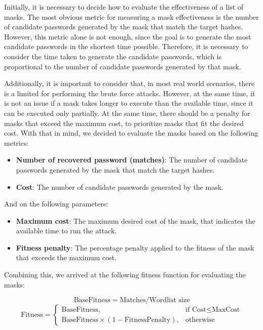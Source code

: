 \documentclass[sigconf,authordraft]{acmart}
\begin{document}
Initially, it is necessary to decide how to evaluate the effectiveness of a list of masks.
The most obvious metric for measuring a mask effectiveness is the number of candidate passwords generated by the mask that match the target hashes.
However, this metric alone is not enough, since the goal is to generate the most candidate passwords in the shortest time possible.
Therefore, it is necessary to consider the time taken to generate the candidate passwords, which is proportional to the number of candidate passwords generated by that mask.

Additionally, it is important to consider that, in most real world scenarios, there is a limited for performing the brute force attacks.
However, at the same time, it is not an issue if a mask takes longer to execute than the available time, since it can be executed only partially.
At the same time, there should be a penalty for masks that exceed the maximum cost, to prioritize masks that fit the desired cost.
With that in mind, we decided to evaluate the masks based on the following metrics:

\begin{itemize}
  \item \textbf{Number of recovered password (matches)}: The number of candidate passwords generated by the mask that match the target hashes.
  \item \textbf{Cost}: The number of candidate passwords generated by the mask.
\end{itemize}

And on the following parameters:

\begin{itemize}
  \item \textbf{Maximum cost}: The maximum desired cost of the mask, that indicates the available time to run the attack.
  \item \textbf{Fitness penalty}: The percentage penalty applied to the fitness of the mask that exceeds the maximum cost.
\end{itemize}

Combining this, we arrived at the following fitness function for evaluating the masks:

\begin{equation}
\label{eq:fitness_function}
  \text{BaseFitness} = \text{Matches} / \text{Wordlist size}
\end{equation}
\begin{equation}
  \text{Fitness} = 
  \begin{cases}
    \text{BaseFitness}, & \text{if Cost} \leq \text{MaxCost} \\
    \text{BaseFitness} \times ( 1 - \text{FitnessPenalty}), & \text{otherwise}
  \end{cases}
\end{equation}
\end{document}
